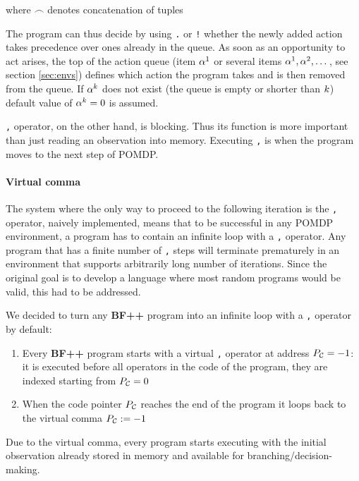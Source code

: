 where $\frown$ denotes concatenation of tuples

The program can thus decide by using \texttt{.} or \texttt{!} whether the newly added action takes precedence over ones already in the queue.
As soon as an opportunity to act arises, the top of the action queue (item $\alpha^1$ or several items $\alpha^1,\alpha^2,\dots$, see section \ref{sec:envs}) defines which action the program takes and is then removed from the queue. 
If $\alpha^k$ does not exist (the queue is empty or shorter than $k$) default value of $\alpha^k=0$ is assumed.

\texttt{,} operator, on the other hand, is blocking. 
Thus its function is more important than just reading an observation into memory.
Executing \texttt{,} is when the program moves to the next step of POMDP.

\paragraph{Virtual comma}
\label{sec:virtualcomma}


The system where the only way to proceed to the following iteration is the \texttt{,} operator, naively implemented, means that to be successful in any POMDP environment, a program has to contain an infinite loop with a \texttt{,} operator.
Any program that has a finite number of \texttt{,} steps will terminate prematurely in an environment that supports arbitrarily long number of iterations.
Since the original goal is to develop a language where most random programs would be valid, this had to be addressed.

We decided to turn any \textbf{BF++} program into an infinite loop with a \texttt{,} operator by default:
\begin{enumerate}
    \item Every \textbf{BF++} program starts with a virtual \texttt{,} operator at address $P_{\mathcal{C}} = -1$: it is executed before all operators in the code of the program, they are indexed starting from $P_{\mathcal{C}} = 0$
    \item When the code pointer $P_{\mathcal{C}}$ reaches the end of the program it loops back to the virtual comma $P_{\mathcal{C}} := -1$
\end{enumerate}

Due to the virtual comma, every program starts executing with the initial observation already stored in memory and available for branching/decision-making.

